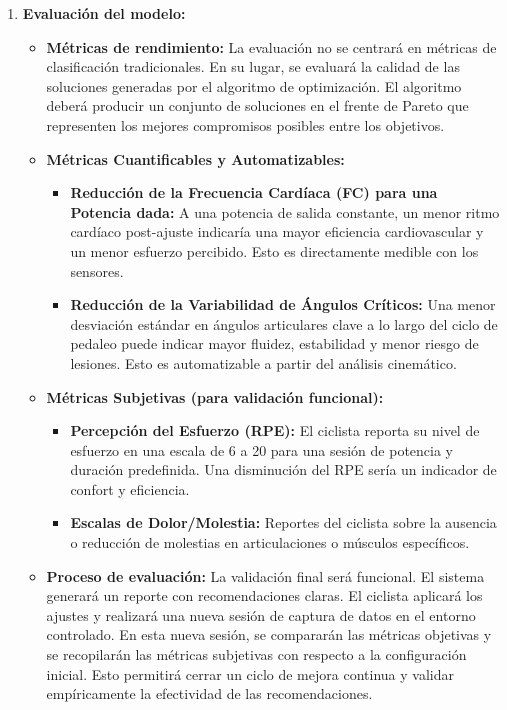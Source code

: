 \documentclass[
11pt, %
]{charter}
\begin{document}
\begin{enumerate}
  \item \textbf{Evaluación del modelo:}
\begin{itemize}
    \item \textbf{Métricas de rendimiento:} La evaluación no se centrará en métricas de clasificación tradicionales. En su lugar, se evaluará la calidad de las soluciones generadas por el algoritmo de optimización. El algoritmo deberá producir un conjunto de soluciones en el frente de Pareto que representen los mejores compromisos posibles entre los objetivos.
    \item \textbf{Métricas Cuantificables y Automatizables:}
    \begin{itemize}
        \item \textbf{Reducción de la Frecuencia Cardíaca (FC) para una Potencia dada:} A una potencia de salida constante, un menor ritmo cardíaco post-ajuste indicaría una mayor eficiencia cardiovascular y un menor esfuerzo percibido. Esto es directamente medible con los sensores.
        \item \textbf{Reducción de la Variabilidad de Ángulos Críticos:} Una menor desviación estándar en ángulos articulares clave  a lo largo del ciclo de pedaleo puede indicar mayor fluidez, estabilidad y menor riesgo de lesiones. Esto es automatizable a partir del análisis cinemático.
    \end{itemize}
    \item \textbf{Métricas Subjetivas (para validación funcional):}
    \begin{itemize}
        \item \textbf{Percepción del Esfuerzo (RPE):} El ciclista reporta su nivel de esfuerzo en una escala de 6 a 20 para una sesión de potencia y duración predefinida. Una disminución del RPE sería un indicador de confort y eficiencia.
        \item \textbf{Escalas de Dolor/Molestia:} Reportes del ciclista sobre la ausencia o reducción de molestias en articulaciones o músculos específicos.
    \end{itemize}
    \item \textbf{Proceso de evaluación:} La validación final será funcional. El sistema generará un reporte con recomendaciones claras. El ciclista aplicará los ajustes y realizará una nueva sesión de captura de datos en el entorno controlado. En esta nueva sesión, se compararán las métricas objetivas y se recopilarán las métricas subjetivas con respecto a la configuración inicial. Esto permitirá cerrar un ciclo de mejora continua y validar empíricamente la efectividad de las recomendaciones.
\end{itemize}
\end{enumerate}
\end{document}
